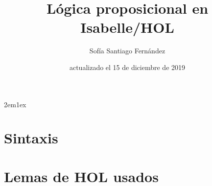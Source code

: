 \documentclass[12pt,a4paper,fleqn]{book}
\begin{document}
\title{Lógica proposicional en Isabelle/HOL}
\author{Sofía Santiago Fernández}
\date{actualizado el 15 de diciembre de 2019}
\maketitle


\tableofcontents

\parindent 2em\parskip 1ex

% 

\chapter{Sintaxis}



\appendix
\chapter{Lemas de HOL usados}


\nocite{LMF, tutorial,fitting1996first}




\todototoc
\listoftodos
\end{document}
